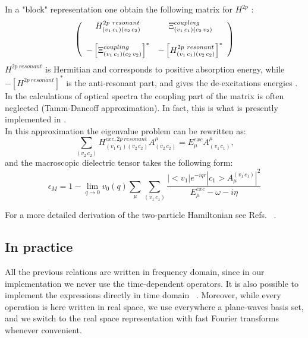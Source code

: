 \documentclass[11pt]{article}
\begin{document}
In a "block" representation one obtain the following matrix for $H^{2p}$ :
\begin{displaymath}
\left(\begin{array}{c c}
H^{2p~resonant}_{(v_{1}\,c_{1})(v_{2}\,c_{2})} & \Xi^{coupling}_{(v_{1}\,c_{1})(c_{2}\,v_{2})} \\
 & \\
-\left[\Xi^{coupling}_{ (v_{1}\,c_{1})(c_{2}\,v_{2})}\right]^{*} & -\left[H^{2p~resonant}_{(v_{1}\,c_{1})(v_{2}\,c_{2})}\right]^{*}
\end{array}\right)
\end{displaymath}
$H^{2p~resonant}$ is Hermitian and corresponds to positive absorption energy,
while $-\left[ H^{2p~resonant} \right]^{*}$ is the anti-resonant part,
and gives the de-excitations energies \cite{rohl-loui00prb}. In the calculations
of optical spectra the coupling part of the matrix is often neglected (Tamm-Dancoff approximation). In fact, this is what is
presently implemented in \SAX.\\
In this approximation the eigenvalue problem can be rewritten as:
\begin{equation}
\sum_{(v_{2}\,c_{2})}H^{exc,2p~resonant}_{(v_{1}\,c_{1})(v_{2}\,c_{2})}A^{\mu}_{(v_{2}\,c_{2})} = E^{exc}_{\mu} A^{\mu}_{(v_{1}\,c_{1})},
\end{equation}
and the macroscopic dielectric tensor takes the following form:
\begin{equation}
\epsilon_{M} = 1 - \lim_{q\to0}v_{0}(q)\sum_{\mu}
\sum_{(v_{1}\,c_{1})}\frac{ | < v_{1} | e^{-iqr} | c_{1} > A^{(v_{1}\,c_{1})}_{\mu}|^{2} }{E^{exc}_{\mu} - \omega -i\eta}
\end{equation}

\noindent For a more detailed derivation of the two-particle Hamiltonian see Refs.~\cite{onid+02rmp,buss04ps} .\\

\subsection{In practice} \label{practice}
All the previous relations are written in frequency domain, since
in our implementation we never use the time-dependent operators.
It is also possible to implement the expressions directly
in time domain ~\cite{roja+95prl}.
Moreover, while every operation is here written in real space,
we use everywhere a plane-waves basis set, and we
switch to the real space representation with fast Fourier transforms
whenever convenient.\\
\end{document}
